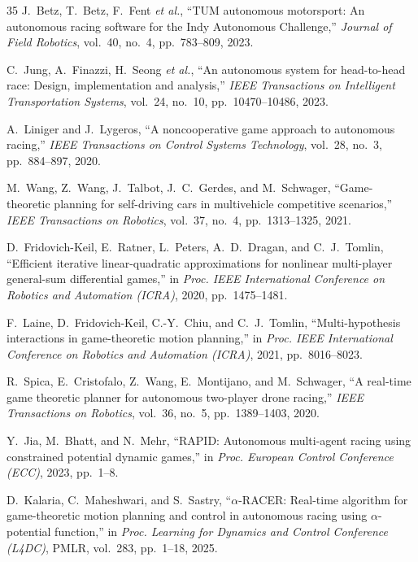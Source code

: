 \documentclass{iopjournal}
\begin{document}
\begin{thebibliography}{35}
J.~Betz, T.~Betz, F.~Fent \emph{et al.},
``TUM autonomous motorsport: An autonomous racing software for the Indy
Autonomous Challenge,'' \emph{Journal of Field Robotics}, vol.~40, no.~4,
pp.~783--809, 2023.

C.~Jung, A.~Finazzi, H.~Seong \emph{et al.},
``An autonomous system for head-to-head race: Design, implementation and
analysis,'' \emph{IEEE Transactions on Intelligent Transportation Systems},
vol.~24, no.~10, pp.~10470--10486, 2023.

A.~Liniger and J.~Lygeros,
``A noncooperative game approach to autonomous racing,''
\emph{IEEE Transactions on Control Systems Technology}, vol.~28, no.~3,
pp.~884--897, 2020.

M.~Wang, Z.~Wang, J.~Talbot, J.~C.~Gerdes, and M.~Schwager,
``Game-theoretic planning for self-driving cars in multivehicle competitive
scenarios,'' \emph{IEEE Transactions on Robotics}, vol.~37, no.~4,
pp.~1313--1325, 2021.

D.~Fridovich-Keil, E.~Ratner, L.~Peters, A.~D.~Dragan, and C.~J.~Tomlin,
``Efficient iterative linear-quadratic approximations for nonlinear
multi-player general-sum differential games,'' in \emph{Proc. IEEE
International Conference on Robotics and Automation (ICRA)}, 2020,
pp.~1475--1481.

F.~Laine, D.~Fridovich-Keil, C.-Y.~Chiu, and C.~J.~Tomlin,
``Multi-hypothesis interactions in game-theoretic motion planning,'' in
\emph{Proc. IEEE International Conference on Robotics and Automation (ICRA)},
2021, pp.~8016--8023.

R.~Spica, E.~Cristofalo, Z.~Wang, E.~Montijano, and M.~Schwager,
``A real-time game theoretic planner for autonomous two-player drone racing,''
\emph{IEEE Transactions on Robotics}, vol.~36, no.~5, pp.~1389--1403, 2020.

Y.~Jia, M.~Bhatt, and N.~Mehr,
``RAPID: Autonomous multi-agent racing using constrained potential dynamic
games,'' in \emph{Proc. European Control Conference (ECC)}, 2023, pp.~1--8.

D.~Kalaria, C.~Maheshwari, and S.~Sastry,
``$\alpha$-RACER: Real-time algorithm for game-theoretic motion planning and
control in autonomous racing using $\alpha$-potential function,'' in
\emph{Proc. Learning for Dynamics and Control Conference (L4DC)}, PMLR,
vol.~283, pp.~1--18, 2025.


\end{thebibliography}
\end{document}
